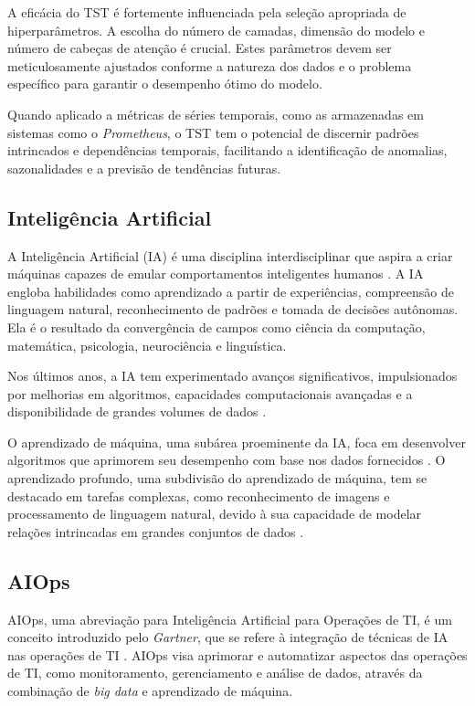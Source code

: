 A eficácia do TST é fortemente influenciada pela seleção apropriada de hiperparâmetros. A escolha do número de camadas, dimensão do modelo e número de cabeças de atenção é crucial. Estes parâmetros devem ser meticulosamente ajustados conforme a natureza dos dados e o problema específico para garantir o desempenho ótimo do modelo.

Quando aplicado a métricas de séries temporais, como as armazenadas em sistemas como o \textit{Prometheus}, o TST tem o potencial de discernir padrões intrincados e dependências temporais, facilitando a identificação de anomalias, sazonalidades e a previsão de tendências futuras.  

\subsection{Inteligência Artificial}
A Inteligência Artificial (IA) é uma disciplina interdisciplinar que aspira a criar máquinas capazes de emular comportamentos inteligentes humanos \cite{russell2016artificial}. A IA engloba habilidades como aprendizado a partir de experiências, compreensão de linguagem natural, reconhecimento de padrões e tomada de decisões autônomas. Ela é o resultado da convergência de campos como ciência da computação, matemática, psicologia, neurociência e linguística.

Nos últimos anos, a IA tem experimentado avanços significativos, impulsionados por melhorias em algoritmos, capacidades computacionais avançadas e a disponibilidade de grandes volumes de dados \cite{poole2017artificial}.

O aprendizado de máquina, uma subárea proeminente da IA, foca em desenvolver algoritmos que aprimorem seu desempenho com base nos dados fornecidos \cite{mitchell1997machine}. O aprendizado profundo, uma subdivisão do aprendizado de máquina, tem se destacado em tarefas complexas, como reconhecimento de imagens e processamento de linguagem natural, devido à sua capacidade de modelar relações intrincadas em grandes conjuntos de dados \cite{lecun2015deep}.

\subsection{AIOps}
AIOps, uma abreviação para Inteligência Artificial para Operações de TI, é um conceito introduzido pelo \textit{Gartner}, que se refere à integração de técnicas de IA nas operações de TI \cite{gardner2017artificial}. AIOps visa aprimorar e automatizar aspectos das operações de TI, como monitoramento, gerenciamento e análise de dados, através da combinação de \textit{big data} e aprendizado de máquina.


